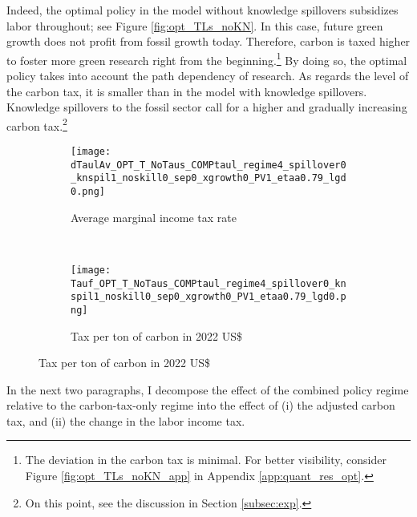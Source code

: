  Indeed, the optimal policy in the model without knowledge spillovers subsidizes labor throughout; see Figure \ref{fig:opt_TLs_noKN}. In this case, future green growth does not profit from fossil growth today. Therefore, carbon is taxed higher to foster more green research right from the beginning.\footnote{ The deviation in the carbon tax is minimal. For better visibility, consider Figure \ref{fig:opt_TLs_noKN_app} in Appendix \ref{app:quant_res_opt}.} By doing so, the optimal policy takes into account the path dependency of research. As regards the level of the carbon tax, it is smaller than in the model with knowledge spillovers. Knowledge spillovers to the fossil sector call for a higher and gradually increasing carbon tax.\footnote{ On this point, see the discussion in Section \ref{subsec:exp}.}

\begin{figure}[h!!!]
	\centering
	\caption{Optimal policy without knowledge spillovers}\label{fig:opt_TLs_noKN}
	\begin{subfigure}{0.4\textwidth}
		\caption{Average marginal income tax rate }
		\texttt{[image: dTaulAv\_OPT\_T\_NoTaus\_COMPtaul\_regime4\_spillover0\_knspil1\_noskill0\_sep0\_xgrowth0\_PV1\_etaa0.79\_lgd0.png]}
	\end{subfigure}
	\begin{minipage}[]{0.1\textwidth}
		\
	\end{minipage}
	\begin{subfigure}{0.4\textwidth}
		\caption{Tax per ton of carbon in 2022 US\$}
		\texttt{[image: Tauf\_OPT\_T\_NoTaus\_COMPtaul\_regime4\_spillover0\_knspil1\_noskill0\_sep0\_xgrowth0\_PV1\_etaa0.79\_lgd0.png]}
	\end{subfigure}
\end{figure} 


In the next two paragraphs, I decompose the effect of the combined policy regime relative to the carbon-tax-only regime into the effect of (i) the adjusted carbon tax, and (ii) the change in the labor income tax. %

